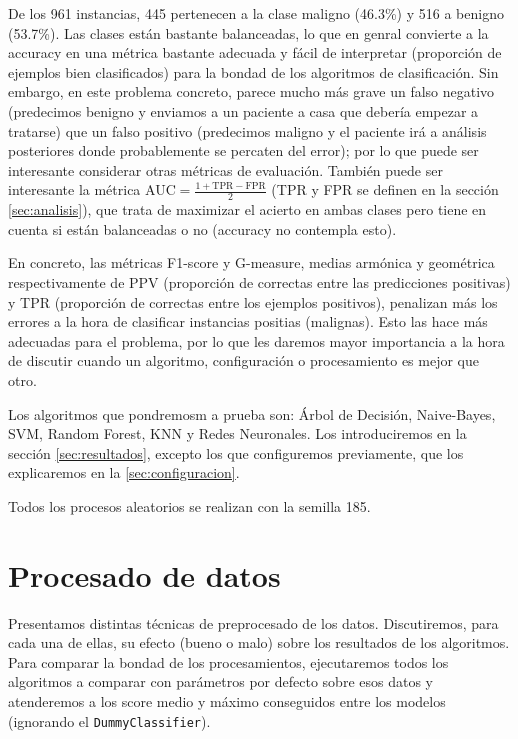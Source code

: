 \documentclass{article}
\begin{document}
De los 961 instancias, 445 pertenecen a la clase maligno (46.3\%) y
516 a benigno (53.7\%). Las clases están bastante balanceadas, lo que
en genral convierte a la accuracy en una métrica bastante adecuada y
fácil de interpretar (proporción de ejemplos bien clasificados) para
la bondad de los algoritmos de clasificación. Sin embargo, en este
problema concreto, parece mucho más grave un falso negativo
(predecimos benigno y enviamos a un paciente a casa que debería
empezar a tratarse) que un falso positivo (predecimos maligno y el
paciente irá a análisis posteriores donde probablemente se percaten
del error); por lo que puede ser interesante considerar otras métricas
de evaluación. También puede ser interesante la métrica
AUC$=\frac{1+\text{TPR}-\text{FPR}}{2}$ (TPR y FPR se definen en la
sección \ref{sec:analisis}), que trata de maximizar el acierto en
ambas clases pero tiene en cuenta si están balanceadas o no (accuracy
no contempla esto).

En concreto, las métricas F1-score y G-measure, medias armónica y
geométrica respectivamente de PPV (proporción de correctas entre las
predicciones positivas) y TPR (proporción de correctas entre los
ejemplos positivos), penalizan más los errores a la hora de clasificar
instancias positias (malignas). Esto las hace más adecuadas para el
problema, por lo que les daremos mayor importancia a la hora de
discutir cuando un algoritmo, configuración o procesamiento es mejor
que otro.

Los algoritmos que pondremosm a prueba son: Árbol de Decisión,
Naive-Bayes, SVM, Random Forest, KNN y Redes Neuronales. Los
introduciremos en la sección \ref{sec:resultados}, excepto los que
configuremos previamente, que los explicaremos en la
\ref{sec:configuracion}.

Todos los procesos aleatorios se realizan con la semilla 185.

\section{Procesado de datos}

Presentamos distintas técnicas de preprocesado de los
datos. Discutiremos, para cada una de ellas, su efecto (bueno o malo)
sobre los resultados de los algoritmos. Para comparar la bondad de los
procesamientos, ejecutaremos todos los algoritmos a comparar con
parámetros por defecto sobre esos datos y atenderemos a los score
medio y máximo conseguidos entre los modelos (ignorando el
\texttt{DummyClassifier}).
\end{document}
